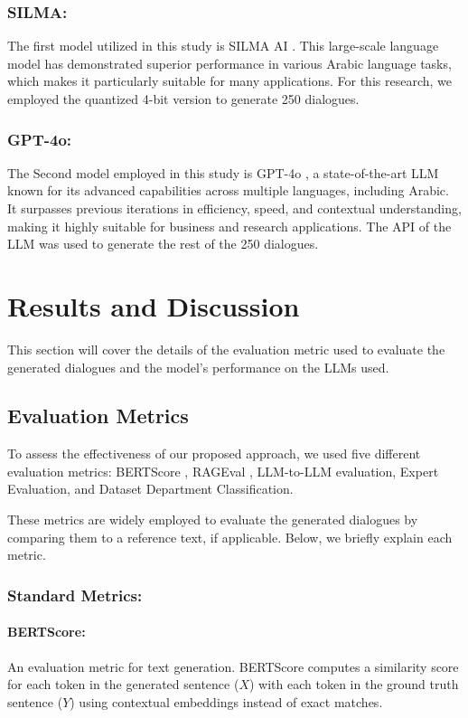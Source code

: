 \documentclass[manuscript,screen,review]{acmart}
\begin{document}
\subsubsection{\textbf{SILMA:}}
The first model utilized in this study is SILMA AI \cite{silma_01_2024}. This large-scale language model has demonstrated superior performance in various Arabic language tasks, which makes it particularly suitable for many applications. For this research, we employed the quantized 4-bit version to generate 250 dialogues.
\subsubsection{\textbf{GPT-4o:}}
The Second model employed in this study is GPT-4o \cite{OpenAI_GPT4o_2024}, a state-of-the-art LLM known for its advanced capabilities across multiple languages, including Arabic. It surpasses previous iterations in efficiency, speed, and contextual understanding, making it highly suitable for business and research applications. The API of the LLM was used to generate the rest of the 250 dialogues.

\section{Results and Discussion}
This section will cover the details of the evaluation metric used to evaluate the generated dialogues and the model's performance on the LLMs used.

\subsection{Evaluation Metrics}
To assess the effectiveness of our proposed approach, we used five different evaluation metrics: BERTScore \cite{zhang2020bertscoreevaluatingtextgeneration}, RAGEval \cite{zhu2024ragevalscenariospecificrag}, LLM-to-LLM evaluation, Expert Evaluation, and Dataset Department Classification.

These metrics are widely employed to evaluate the generated dialogues by comparing them to a reference text, if applicable. Below, we briefly explain each metric.
\subsubsection{Standard Metrics:}


\paragraph{\textbf{BERTScore}:} An evaluation metric \cite{zhang2020bertscoreevaluatingtextgeneration} for text generation. BERTScore computes a similarity score for each token in the generated sentence ($X$) with each token in the ground truth sentence ($Y$) using contextual embeddings instead of exact matches. 
\end{document}
